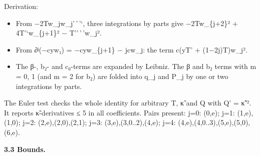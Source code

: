 \documentclass[
]{article}
\providecommand{\tightlist}{%
  \setlength{\itemsep}{0pt}\setlength{\parskip}{0pt}}
\begin{document}
Derivation:

\begin{itemize}
\tightlist
\item
  From −2Tw\_jw\_j'\,'\,'`, three integrations by parts give
  −2Tw\_\{j+2\}² + 4T'`w\_\{j+1\}² − T''\,'\,'w\_j².
\item
  From ∂ʲ(−cyw₁) = −cyw\_\{j+1\} − jcw\_j: the term c(yT' +
  (1−2j)T)w\_j².
\item
  The β-, b₂- and c₀-terms are expanded by Leibniz. The β and b₂ terms
  with m = 0, 1 (and m = 2 for b₂) are folded into q\_j and P\_j by one
  or two integrations by parts.
\end{itemize}

The Euler test checks the whole identity for arbitrary T, κ̃ and Q with
Q' = κ̃'². It reports κ̃-derivatives ≤ 5 in all coefficients. Pairs
present: j=0: (0,e); j=1: (1,e),(1,0); j=2: (2,e),(2,0),(2,1); j=3:
(3,e),(3,0..2),(4,e); j=4: (4,e),(4,0..3),(5,e),(5,0),(6,e).

\textbf{3.3 Bounds.}
\end{document}
